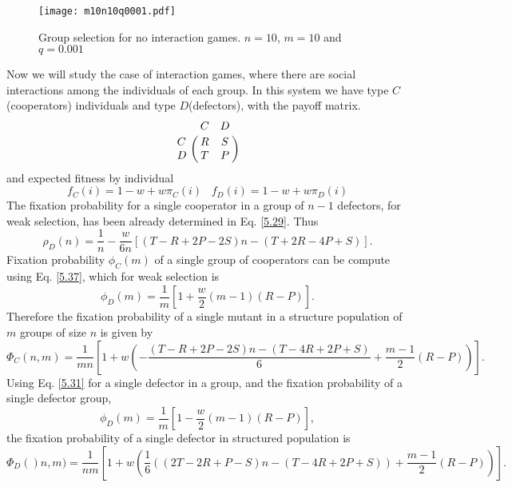 \begin{figure}[H]\label{Fig5.3}
        \begin{center}
  \texttt{[image: m10n10q0001.pdf]}
     \end{center}
      \caption{Group selection for no interaction games. $n=10$, $m=10$ and $q=0.001$} 
   \end{figure}
 Now we will study the case of interaction games, where there are social interactions among the individuals of each group. In this system we have type $C$(cooperators) individuals and type $D$(defectors), with the payoff matrix.
 \begin{equation}
 \bordermatrix{~ & C & D \cr
             C & R & S \cr
              D & T & P \cr} 
 \end{equation} 
 and expected fitness by individual
  \begin{equation}
  f_{C}(i)=1-w+w\pi_{C}(i) \;\;\;  f_{D}(i)=1-w+w\pi_{D}(i)
  \end{equation}
 The fixation probability for a single cooperator in a group of $n-1$ defectors, for weak selection, has been already determined in Eq. \eqref{5.29}. Thus
 \begin{equation}
 \rho_{D}(n)=\frac{1}{n} -\frac{w}{6n}\left[ (T-R+2P-2S)n-(T+2R-4P+S)\right].
 \end{equation}
Fixation probability $\phi_{C}(m)$ of a single group of cooperators can be compute using Eq. \eqref{5.37}, which for weak selection is\cite{Traulsen2006a}
\begin{equation}
\phi_{D}(m)=\frac{1}{m}\left[1+\frac{w}{2}(m-1)(R-P)\right].
\end{equation} 
Therefore the fixation probability of a single mutant in a structure population of $m$ groups of size $n$ is given by
\begin{equation}
\Phi_{C}(n,m)=\frac{1}{mn}\left[1+w\left(-\frac{(T-R+2P-2S)n-(T-4R+2P+S)}{6}+\frac{m-1}{2}(R-P)\right)\right].
\end{equation}
Using Eq. \eqref{5.31} for a single defector in a group, and the fixation probability of a single defector group,
\begin{equation}
\phi_{D}(m)=\frac{1}{m}\left[1-\frac{w}{2}(m-1)(R-P)\right],
\end{equation}
the fixation probability of a single defector in structured population is
\begin{equation}
\Phi_{D}()n,m)=\frac{1}{nm}\left[1+w\left(\frac{1}{6}((2T-2R+P-S)n-(T-4R+2P+S)) +\frac{m-1}{2}(R-P)\right)\right].
\end{equation}

